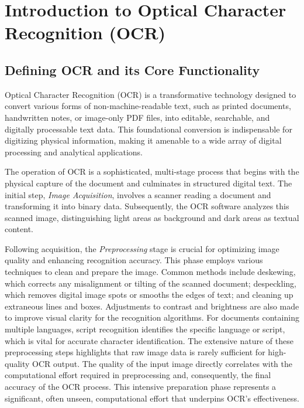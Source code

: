 \section{Introduction to Optical Character Recognition (OCR)}
\label{sec:intro-ocr}

\subsection{Defining OCR and its Core Functionality}

Optical Character Recognition (OCR) is a transformative technology designed to convert various forms of non-machine-readable text, such as printed documents, handwritten notes, or image-only PDF files, into editable, searchable, and digitally processable text data. \cite{AWSOCR,AdobeOCR} This foundational conversion is indispensable for digitizing physical information, making it amenable to a wide array of digital processing and analytical applications.

The operation of OCR is a sophisticated, multi-stage process that begins with the physical capture of the document and culminates in structured digital text. The initial step, \emph{Image Acquisition}, involves a scanner reading a document and transforming it into binary data. Subsequently, the OCR software analyzes this scanned image, distinguishing light areas as background and dark areas as textual content. \cite{AWSOCR,AdobeOCR}

Following acquisition, the \emph{Preprocessing} stage is crucial for optimizing image quality and enhancing recognition accuracy. This phase employs various techniques to clean and prepare the image. Common methods include deskewing, which corrects any misalignment or tilting of the scanned document; despeckling, which removes digital image spots or smooths the edges of text; and cleaning up extraneous lines and boxes. \cite{AWSOCR,AdobeOCR,ContinualEngineOCR} Adjustments to contrast and brightness are also made to improve visual clarity for the recognition algorithms. For documents containing multiple languages, script recognition identifies the specific language or script, which is vital for accurate character identification. \cite{AWSOCR,AdobeOCR} The extensive nature of these preprocessing steps highlights that raw image data is rarely sufficient for high-quality OCR output. The quality of the input image directly correlates with the computational effort required in preprocessing and, consequently, the final accuracy of the OCR process. This intensive preparation phase represents a significant, often unseen, computational effort that underpins OCR's effectiveness.

